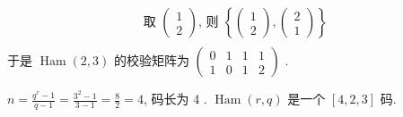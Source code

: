 \begin{example}
$$\begin{array}{l}
\text { 取 }\left(\begin{array}{l}
1 \\
2
\end{array}\right) \text {, 则 }\left\{\left(\begin{array}{l}
1 \\
2
\end{array}\right),\left(\begin{array}{l}
2 \\
1
\end{array}\right)\right\} \\
\end{array}
$$
于是 $ \operatorname{Ham}(2,3) $ 的校验矩阵为 $ \left(\begin{array}{llll}0 & 1 & 1 & 1 \\ 1 & 0 & 1 & 2\end{array}\right) $ .

$ n=\frac{q^{r}-1}{q-1}=\frac{3^{2}-1}{3-1}=\frac{8}{2}=4 $, 码长为 4 .
$ \operatorname{Ham}(r, q) $ 是一个 $ [4,2,3] $ 码.
\end{example}


